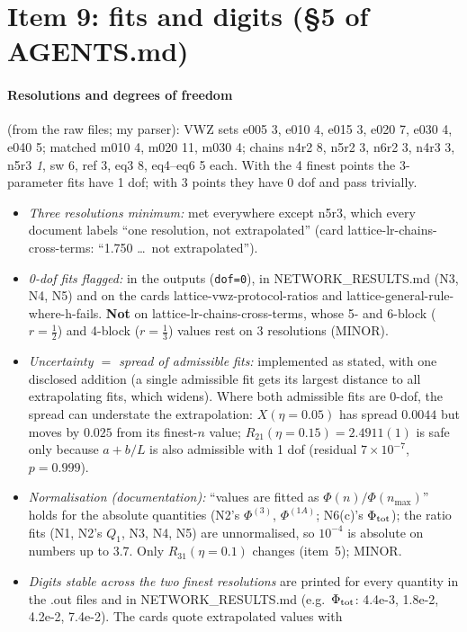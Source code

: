\documentclass[11pt]{article}
\begin{document}
\section{Item 9: fits and digits (\S5 of AGENTS.md)}\label{sec:i9}
\paragraph{Resolutions and degrees of freedom} (from the raw files; my parser): VWZ sets e005 3, e010 4, e015 3,
e020 7, e030 4, e040 5; matched m010 4, m020 11, m030 4; chains n4r2 8, n5r2 3, n6r2 3, n4r3 3, n5r3 \emph{1},
sw 6, ref 3, eq3 8, eq4--eq6 5 each. With the 4 finest points the 3-parameter fits have 1 dof; with 3 points they
have 0 dof and pass trivially.
\begin{itemize}
\item \emph{Three resolutions minimum:} met everywhere except n5r3, which every document labels ``one resolution,
 not extrapolated'' (card lattice-lr-chains-cross-terms: ``1.750 \ldots\ not extrapolated'').
\item \emph{0-dof fits flagged:} in the outputs (\texttt{dof=0}), in NETWORK\_RESULTS.md (N3, N4, N5) and on the
 cards lattice-vwz-protocol-ratios and lattice-general-rule-where-h-fails. \textbf{Not} on lattice-lr-chains-cross-terms,
 whose 5- and 6-block ($r=\frac12$) and 4-block ($r=\frac13$) values rest on 3 resolutions (MINOR).
\item \emph{Uncertainty $=$ spread of admissible fits:} implemented as stated, with one disclosed addition (a single
 admissible fit gets its largest distance to all extrapolating fits, which widens). Where both admissible fits are
 0-dof, the spread can understate the extrapolation: $X(\eta=0.05)$ has spread $0.0044$ but moves by $0.025$ from
 its finest-$n$ value; $R_{21}(\eta=0.15)=2.4911(1)$ is safe only because $a+b/L$ is also admissible with 1 dof
 (residual $7\times10^{-7}$, $p=0.999$).
\item \emph{Normalisation (documentation):} ``values are fitted as $\Phi(n)/\Phi(n_{\max})$'' holds for the absolute quantities
 (N2's $\Phi^{(3)}$, $\Phi^{(1A)}$; N6(c)'s $\Phi_{\rm tot}$); the ratio fits (N1, N2's $Q_1$, N3, N4, N5) are unnormalised, so $10^{-4}$ is absolute on numbers up to 3.7. Only
 $R_{31}(\eta=0.1)$ changes (item~5); MINOR.
\item \emph{Digits stable across the two finest resolutions} are printed for every quantity in the .out files and in
 NETWORK\_RESULTS.md (e.g.\ $\Phi_{\rm tot}$: 4.4e-3, 1.8e-2, 4.2e-2, 7.4e-2). The cards quote extrapolated values with

\end{itemize}
\end{document}

